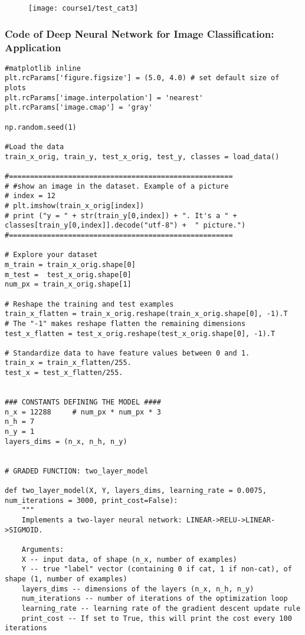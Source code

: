 \begin{figure}[H]
  \centering
  \texttt{[image: course1/test\_cat3]} 
\end{figure}

\clearpage
\subsubsection{Code of Deep Neural Network for Image Classification: Application}
\begin{verbatim}
#matplotlib inline
plt.rcParams['figure.figsize'] = (5.0, 4.0) # set default size of plots
plt.rcParams['image.interpolation'] = 'nearest'
plt.rcParams['image.cmap'] = 'gray'

np.random.seed(1)

#Load the data 
train_x_orig, train_y, test_x_orig, test_y, classes = load_data()

#=====================================================
# #show an image in the dataset. Example of a picture
# index = 12
# plt.imshow(train_x_orig[index])
# print ("y = " + str(train_y[0,index]) + ". It's a " + classes[train_y[0,index]].decode("utf-8") +  " picture.")
#=====================================================

# Explore your dataset 
m_train = train_x_orig.shape[0]
m_test =  test_x_orig.shape[0]
num_px = train_x_orig.shape[1]

# Reshape the training and test examples 
train_x_flatten = train_x_orig.reshape(train_x_orig.shape[0], -1).T   # The "-1" makes reshape flatten the remaining dimensions
test_x_flatten = test_x_orig.reshape(test_x_orig.shape[0], -1).T

# Standardize data to have feature values between 0 and 1.
train_x = train_x_flatten/255.
test_x = test_x_flatten/255.


### CONSTANTS DEFINING THE MODEL ####
n_x = 12288     # num_px * num_px * 3
n_h = 7
n_y = 1
layers_dims = (n_x, n_h, n_y)


# GRADED FUNCTION: two_layer_model

def two_layer_model(X, Y, layers_dims, learning_rate = 0.0075, num_iterations = 3000, print_cost=False):
    """
    Implements a two-layer neural network: LINEAR->RELU->LINEAR->SIGMOID.
    
    Arguments:
    X -- input data, of shape (n_x, number of examples)
    Y -- true "label" vector (containing 0 if cat, 1 if non-cat), of shape (1, number of examples)
    layers_dims -- dimensions of the layers (n_x, n_h, n_y)
    num_iterations -- number of iterations of the optimization loop
    learning_rate -- learning rate of the gradient descent update rule
    print_cost -- If set to True, this will print the cost every 100 iterations 
    

\end{verbatim}
